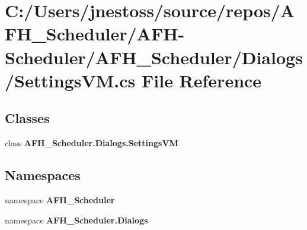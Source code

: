 \section{C\+:/\+Users/jnestoss/source/repos/\+A\+F\+H\+\_\+\+Scheduler/\+A\+F\+H-\/\+Scheduler/\+A\+F\+H\+\_\+\+Scheduler/\+Dialogs/\+Settings\+VM.cs File Reference}
\label{_settings_v_m_8cs}
\subsection*{Classes}
\begin{DoxyCompactItemize}
\item 
class \textbf{ A\+F\+H\+\_\+\+Scheduler.\+Dialogs.\+Settings\+VM}
\end{DoxyCompactItemize}
\subsection*{Namespaces}
\begin{DoxyCompactItemize}
\item 
namespace \textbf{ A\+F\+H\+\_\+\+Scheduler}
\item 
namespace \textbf{ A\+F\+H\+\_\+\+Scheduler.\+Dialogs}
\end{DoxyCompactItemize}
